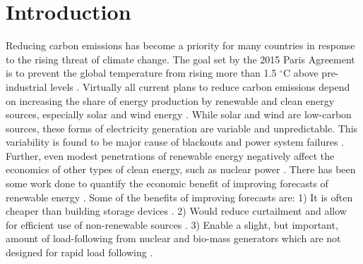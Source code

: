 \section{Introduction}
Reducing carbon emissions has become a priority for many countries in response
to the rising threat of climate change. The goal set by the 2015 Paris
Agreement is to prevent the global temperature from rising more than 1.5
$^\circ$C above pre-industrial levels \cite{noauthor_paris_nodate}. Virtually
all current plans to reduce carbon emissions depend on increasing the share of
energy production by
renewable and clean energy sources, especially solar and wind energy \cite{cany_nuclear_2018, chilvers_realising_2017}. While solar and wind are low-carbon sources, these
forms of electricity generation are variable and unpredictable. This variability
is found to be major cause of blackouts and power system failures
\cite{haes_alhelou_survey_2019}. Further, even modest penetrations of renewable
energy negatively affect the economics of other types of clean energy, such as
nuclear power \cite{cany_nuclear_2018, keppler_carbon_2011}. There has been
some work done to quantify the economic benefit of improving forecasts of
renewable energy \cite{wang_quantifying_2016, mc_garrigle_quantifying_2015, brancucci_martinez-anido_value_2016}. Some of the benefits of improving
forecasts are: 1) It is often cheaper than building storage devices
\cite{wang_quantifying_2016}. 2) Would reduce curtailment and allow for
efficient
use of non-renewable sources \cite{mc_garrigle_quantifying_2015}. 3) Enable a
slight, but important, amount of load-following from nuclear and bio-mass generators which are not designed for rapid load following \cite{brancucci_martinez-anido_value_2016}.
